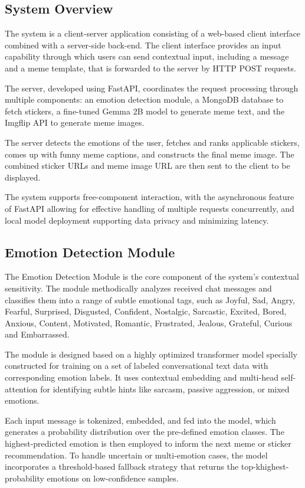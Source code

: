 \documentclass[conference]{IEEEtran}
\begin{document}
\subsection{System Overview}
The system is a client-server application consisting of a web-based client interface combined with a server-side back-end. The client interface provides an input capability through which users can send contextual input, including a message and a meme template, that is forwarded to the server by HTTP POST requests.

The server, developed using FastAPI, coordinates the request processing through multiple components: an emotion detection module, a MongoDB database to fetch stickers, a fine-tuned Gemma 2B model to generate meme text, and the Imgflip API to generate meme images.

The server detects the emotions of the user, fetches and ranks applicable stickers, comes up with funny meme captions, and constructs the final meme image. The combined sticker URLs and meme image URL are then sent to the client to be displayed.

The system supports free-component interaction, with the asynchronous feature of FastAPI allowing for effective handling of multiple requests concurrently, and local model deployment supporting data privacy and minimizing latency.

\subsection{Emotion Detection Module}
The Emotion Detection Module is the core component of the system’s contextual sensitivity. The module methodically analyzes received chat messages and classifies them into a range of subtle emotional tags, such as Joyful, Sad, Angry, Fearful, Surprised, Disgusted, Confident, Nostalgic, Sarcastic, Excited, Bored, Anxious, Content, Motivated, Romantic, Frustrated, Jealous, Grateful, Curious and Embarrassed.

The module is designed based on a highly optimized transformer model specially constructed for training on a set of labeled conversational text data with corresponding emotion labels. It uses contextual embedding and multi-head self-attention for identifying subtle hints like sarcasm, passive aggression, or mixed emotions.

Each input message is tokenized, embedded, and fed into the model, which generates a probability distribution over the pre-defined emotion classes. The highest-predicted emotion is then employed to inform the next meme or sticker recommendation. To handle uncertain or multi-emotion cases, the model incorporates a threshold-based fallback strategy that returns the top-khighest-probability emotions on low-confidence samples.
\end{document}
